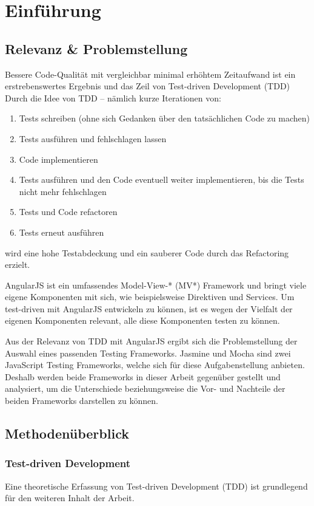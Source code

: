 
\section{Einführung}
\label{Einführung}
\subsection{Relevanz \& Problemstellung}
Bessere Code-Qualität mit vergleichbar minimal erhöhtem Zeitaufwand ist ein erstrebenswertes Ergebnis und das Zeil von Test-driven Development (TDD) Durch die Idee von TDD -- nämlich kurze Iterationen von:
\begin{enumerate}
  \item Tests schreiben (ohne sich Gedanken über den tatsächlichen Code zu machen)
  \item Tests ausführen und fehlschlagen lassen
  \item Code implementieren
  \item Tests ausführen und den Code eventuell weiter implementieren, bis die 
  Tests nicht mehr fehlschlagen
  \item Tests und Code refactoren
  \item Tests erneut ausführen
\end{enumerate}
wird eine hohe Testabdeckung und ein sauberer Code durch das Refactoring erzielt.

AngularJS ist ein umfassendes Model-View-* (MV*) Framework und bringt viele eigene Komponenten mit sich, wie beispielsweise Direktiven und Services. Um test-driven mit AngularJS entwickeln zu können, ist es wegen der Vielfalt der eigenen Komponenten relevant, alle diese Komponenten testen zu können.

Aus der Relevanz von TDD mit AngularJS ergibt sich die Problemstellung der Auswahl eines passenden Testing Frameworks. Jasmine und Mocha sind zwei JavaScript Testing Frameworks, welche sich für diese Aufgabenstellung anbieten. Deshalb werden beide Frameworks in dieser Arbeit gegenüber gestellt und analysiert, um die Unterschiede beziehungsweise die Vor- und Nachteile der beiden Frameworks darstellen zu können.

\subsection{Methodenüberblick}
\subsubsection{Test-driven Development}
Eine theoretische Erfassung von Test-driven Development (TDD) ist grundlegend für den weiteren Inhalt der Arbeit.

